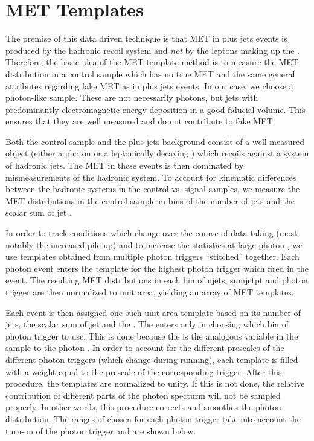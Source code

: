 
\section{MET Templates}
\label{sec:templates}

The premise of this data driven technique is that MET in \Z plus jets events
is produced by the hadronic recoil system and {\it not} by the leptons making up the \Z.
Therefore, the basic idea of the MET template method is to measure the MET distribution in 
a control sample which has no true MET and the same general attributes regarding
fake MET as in \Z plus jets events.
In our case, we choose a photon-like sample. These are not necessarily photons, but jets with predominantly 
electromagnetic energy deposition in a good fiducial volume. This ensures that 
they are well measured and do not contribute to fake MET.

Both the control sample and the \Z plus jets background
consist of a well measured object (either a photon or a leptonically decaying \Z) which recoils 
against a system of hadronic jets. The MET in these events 
is then dominated by mismeasurements of the hadronic system. To account for kinematic 
differences between the hadronic systems in the control vs. signal samples, 
we measure the MET distributions in the control sample in bins of the number of jets and the 
scalar sum of jet \pt. 

In order to track conditions which change over the course of data-taking
(most notably the increased pile-up) and to increase the statistics at large photon \pt, we
use templates obtained from multiple photon triggers ``stitched'' together. 
Each photon event enters the template for the
highest \pt photon trigger which fired in the event. The resulting MET 
distributions in each bin of njets, sumjetpt and photon trigger are then 
normalized to unit area, yielding an array of MET templates. 

Each \Z event is then assigned one such 
unit area template based on its number of jets, the scalar sum of jet \pt and the \Z \pt. 
The \Z \pt enters only in choosing which bin of photon trigger to use. 
This is done because the \Z \pt is the analogous variable in the \Z sample 
to the photon \pt. 
In order to account for the different prescales of the different photon triggers (which 
change during running), 
each template is filled with a weight equal to the prescale of the corresponding trigger.
After this procedure, the templates are normalized to unity.
If this is not done, the relative contribution of different parts of the photon
\pt specturm will not be sampled properly. In other words, this procedure corrects and 
smoothes the photon \pt distribution.%
The ranges of \Z \pt chosen for each photon trigger 
take into account the turn-on of the photon trigger and are shown below.

